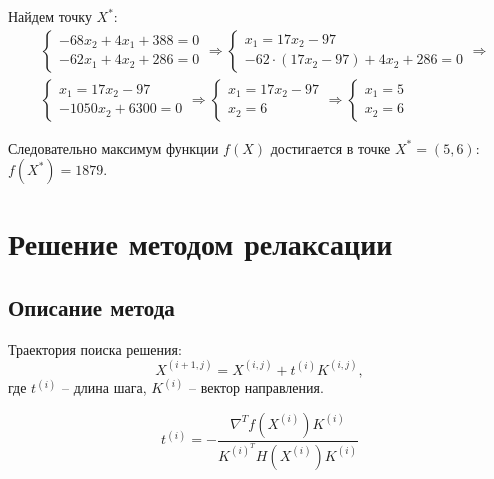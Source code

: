 Найдем точку $X^*$:
\begin{align*}
&\begin{cases}
	-68 x_2 + 4 x_1 + 388 = 0 \\
	-62 x_1 + 4 x_2 + 286 = 0 
\end{cases}\Rightarrow
\begin{cases}
	x_1 = 17 x_2 - 97 \\
	-62 \cdot (17 x_2 - 97) + 4 x_2 + 286 = 0
\end{cases}\Rightarrow \\
&\begin{cases}
	x_1 = 17 x_2 - 97 \\
	-1050 x_2 + 6300 = 0
\end{cases}\Rightarrow
\begin{cases}
	x_1 = 17 x_2 - 97 \\
	x_2 = 6
\end{cases}\Rightarrow
\begin{cases}
	x_1 = 5 \\
	x_2 = 6
\end{cases}
\end{align*}

Следовательно максимум функции $f(X)$ достигается в точке $X^* = (5, 6)$: $f(X^*) = 1879$.

\section{Решение методом релаксации}

\subsection{Описание метода}

Траектория поиска решения:
\begin{equation*}
X^{(i+1,j)}  = X^{(i,j)} + t^{(i)} K^{(i,j)},
\end{equation*}
где $t^{(i)}$ -- длина шага, $K^{(i)}$ -- вектор направления.


\begin{equation*}
t^{(i)} = -\dfrac{\nabla^T f\left(X^{(i)}\right) K^{(i)}}{K^{(i)^T} H\left(X^{(i)}\right) K^{(i)}}
\end{equation*}

